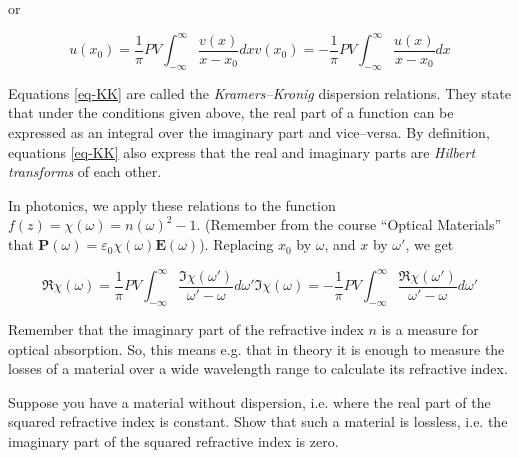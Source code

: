 or

\begin{subequations} 
\begin{equation}
u(x_0) = \frac{1}{\pi} PV \int_{- \infty}^{\infty} \frac{v(x)}{x-x_0}dx
\end{equation} 
\begin{equation}
v(x_0) = -\frac{1}{\pi} PV \int_{- \infty}^{\infty} \frac{u(x)}{x-x_0}dx
\end{equation}
\label{eq-KK}
\end{subequations}

Equations \ref{eq-KK} are called the \emph{Kramers--Kronig} dispersion
relations. They state that under the conditions given above, the real part of a
function can be expressed as an integral over the imaginary part and
vice--versa. By definition, equations \ref{eq-KK} also express that the real and
imaginary parts are \emph{Hilbert transforms} of each other.

In photonics, we apply these relations to the function $f(z) = \chi(\omega) =
n(\omega)^2 -1$. (Remember from the course ``Optical Materials'' that
$\mathbf{P}(\omega)=\varepsilon_0 \chi(\omega) \mathbf{E}(\omega)$). Replacing
$x_0$ by $\omega$, and $x$ by $\omega'$, we get

\begin{subequations} 
\begin{equation}
\Re \chi(\omega) = \frac{1}{\pi} PV \int_{- \infty}^{\infty} \frac{\Im
\chi(\omega')}{\omega'-\omega}d\omega'
\end{equation} 
\begin{equation}
\Im \chi(\omega) = -\frac{1}{\pi} PV \int_{- \infty}^{\infty} \frac{\Re
\chi(\omega')}{\omega'-\omega}d\omega'
\end{equation}
\label{eq-KK-2}
\end{subequations}

Remember that the imaginary part of the refractive index $n$ is a measure for
optical absorption. So, this means e.g. that in theory it is enough to measure
the losses of a material over a wide wavelength range to calculate its
refractive index.

\begin{sidebar}
\begin{ex}
Suppose you have a material without dispersion, i.e. where the real part of the squared refractive index is constant. Show that such a material is lossless, i.e. the imaginary part of the squared refractive index is zero.
\end{ex}
\end{sidebar}

